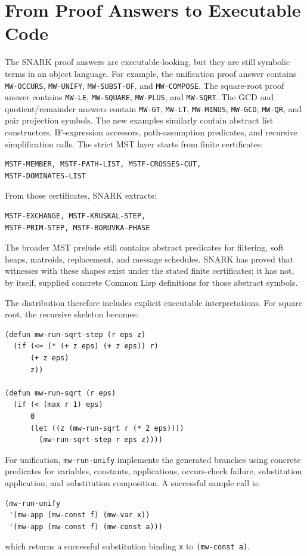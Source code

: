 \documentclass[runningheads]{llncs}
\begin{document}
\section{From Proof Answers to Executable Code}

The SNARK proof answers are executable-looking, but they are still symbolic
terms in an object language.  For example, the unification proof answer contains
\texttt{MW-OCCURS}, \texttt{MW-UNIFY}, \texttt{MW-SUBST-OF}, and
\texttt{MW-COMPOSE}.  The square-root proof answer contains \texttt{MW-LE},
\texttt{MW-SQUARE}, \texttt{MW-PLUS}, and \texttt{MW-SQRT}.  The GCD and
quotient/remainder answers contain \texttt{MW-GT}, \texttt{MW-LT},
\texttt{MW-MINUS}, \texttt{MW-GCD}, \texttt{MW-QR}, and pair projection
symbols.  The new examples similarly contain abstract list constructors,
IF-expression accessors, path-assumption predicates, and recursive
simplification calls.  The strict MST layer starts from finite certificates:
\begin{lstlisting}
MSTF-MEMBER, MSTF-PATH-LIST, MSTF-CROSSES-CUT,
MSTF-DOMINATES-LIST
\end{lstlisting}
From those certificates, SNARK extracts:
\begin{lstlisting}
MSTF-EXCHANGE, MSTF-KRUSKAL-STEP,
MSTF-PRIM-STEP, MSTF-BORUVKA-PHASE
\end{lstlisting}
The broader MST prelude still contains abstract predicates for filtering, soft
heaps, matroids, replacement, and message schedules.  SNARK has proved that
witnesses with these shapes exist under the stated finite certificates; it has
not, by itself, supplied concrete Common Lisp definitions for those abstract
symbols.

The distribution therefore includes explicit executable interpretations.  For
square root, the recursive skeleton becomes:
\begin{lstlisting}
(defun mw-run-sqrt-step (r eps z)
  (if (<= (* (+ z eps) (+ z eps)) r)
      (+ z eps)
      z))

(defun mw-run-sqrt (r eps)
  (if (< (max r 1) eps)
      0
      (let ((z (mw-run-sqrt r (* 2 eps))))
        (mw-run-sqrt-step r eps z))))
\end{lstlisting}
For unification, \texttt{mw-run-unify} implements the generated branches using
concrete predicates for variables, constants, applications, occurs-check
failure, substitution application, and substitution composition.  A successful
sample call is:
\begin{lstlisting}
(mw-run-unify
 '(mw-app (mw-const f) (mw-var x))
 '(mw-app (mw-const f) (mw-const a)))
\end{lstlisting}
which returns a successful substitution binding \texttt{x} to
\texttt{(mw-const a)}.
\end{document}
